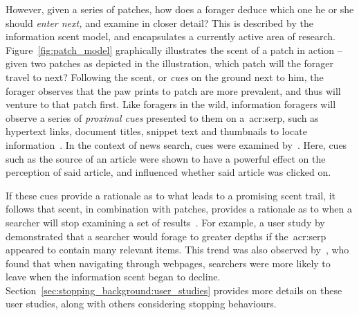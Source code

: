 However, given a series of patches, how does a forager deduce which one he or she should \emph{enter next,} and examine in closer detail? This is described by the information scent model, and encapsulates a currently active area of research. Figure~\ref{fig:patch_model} graphically illustrates the scent of a patch in action -- given two patches as depicted in the illustration, which patch will the forager travel to next? Following the scent, or \emph{cues} on the ground next to him, the forager observes that the paw prints to patch  are more prevalent, and thus will venture to that patch first. Like foragers in the wild, information foragers will observe a series of \emph{proximal cues} presented to them on a~\gls{acr:serp}, such as hypertext links, document titles, snippet text and thumbnails to locate information~\citep{pirolli1995ift, pirolli1999ift, chi2001information_scent, oltston2003scenttrails, pirolli2007ift}. In the context of news search, cues were examined by~\cite{sundar2007news_scent}. Here, cues such as the source of an article were shown to have a powerful effect on the perception of said article, and influenced whether said article was clicked on.

If these cues provide a rationale as to what leads to a promising scent trail, it follows that scent, in combination with patches, provides a rationale as to when a searcher will stop examining a set of results~\citep{pirolli1999ift, wu2012dc, wu2014information_scent}. For example, a user study by~\cite{wu2014information_scent} demonstrated that a searcher would forage to greater depths if the~\gls{acr:serp} appeared to contain many relevant items. This trend was also observed by~\cite{card2001scent_graphs}, who found that when navigating through webpages, searchers were more likely to leave when the information scent began to decline. Section~\ref{sec:stopping_background:user_studies} provides more details on these user studies, along with others considering stopping behaviours.


